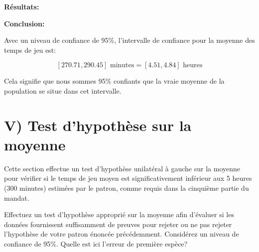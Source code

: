 \textbf{Résultats:}

\textbf{Conclusion:}

Avec un niveau de confiance de 95\%, l'intervalle de confiance pour la
moyenne des temps de jeu est:

\[
[270.71, 290.45] \text{ minutes} = [4.51, 4.84] \text{ heures}
\]

Cela signifie que nous sommes 95\% confiants que la vraie moyenne de la
population se situe dans cet intervalle.



    \section{V) Test d'hypothèse sur la
moyenne}\label{v-test-dhypothuxe8se-sur-la-moyenne}

Cette section effectue un test d'hypothèse unilatéral à gauche sur la
moyenne pour vérifier si le temps de jeu moyen est significativement
inférieur aux 5 heures (300 minutes) estimées par le patron, comme
requis dans la cinquième partie du mandat.

Effectuez un test d'hypothèse approprié sur la moyenne afin d'évaluer si
les données fournissent suffisamment de preuves pour rejeter ou ne pas
rejeter l'hypothèse de votre patron énoncée précédemment. Considérez un
niveau de confiance de 95\%. Quelle est ici l'erreur de première espèce?

